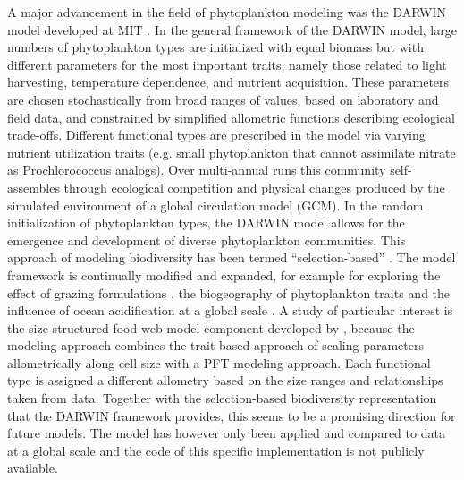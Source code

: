 A major advancement in the field of phytoplankton modeling was the DARWIN model developed at MIT \citep{Follows2007d}. In the general framework of the DARWIN model, large numbers of phytoplankton types are initialized with equal biomass but with different parameters for the most important traits, namely those related to light harvesting, temperature dependence, and nutrient acquisition. These parameters are chosen stochastically from broad ranges of values, based on laboratory and field data, and constrained by simplified allometric functions describing ecological trade-offs. Different functional types are prescribed in the model via varying nutrient utilization traits (e.g. small phytoplankton that cannot assimilate nitrate as Prochlorococcus analogs). Over multi-annual runs this community self-assembles through ecological competition and physical changes produced by the simulated environment of a global circulation model (GCM). In the random initialization of phytoplankton types, the DARWIN model allows for the emergence and development of diverse phytoplankton communities. This approach of modeling biodiversity has been termed “selection-based” \citep{Follows2011c}. 
The model framework is continually modified and expanded, for example for exploring the effect of grazing formulations \citep{Prowe2012c}, the biogeography of phytoplankton traits \citep{Barton2013} and the influence of ocean acidification at a global scale \citep{Dutkiewicz2015}. A study of particular interest is the size-structured food-web model component developed by \citet{Ward2012}, because the modeling approach combines the trait-based approach of scaling parameters allometrically along cell size with a PFT modeling approach. 
Each functional type is assigned a different allometry based on the size ranges and relationships taken from data. Together with the selection-based biodiversity representation that the DARWIN framework provides, this seems to be a promising direction for future models. The model has however only been applied and compared to data at a global scale and the code of this specific implementation is not publicly available. 

